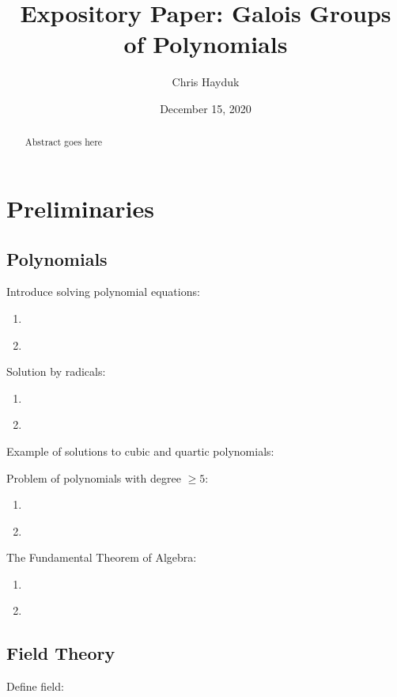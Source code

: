\documentclass[11pt, a4paper, oneside]{article}
\theoremstyle{plain}
\theoremstyle{definition}
\theoremstyle{example}
\begin{document}
\title{Expository Paper: Galois Groups of Polynomials}
\author{Chris Hayduk}
\date{December 15, 2020}
\maketitle

\begin{abstract}
Abstract goes here
\end{abstract}

\newpage
\section{Preliminaries}

\subsection{Polynomials}

Introduce solving polynomial equations:
\begin{enumerate}
\item \cite[Sec. 1.3]{stewart}
\item \cite[Ch. 1]{jorg}
\end{enumerate}

Solution by radicals:
\begin{enumerate}
\item \cite[Sec. 1.4]{stewart}
\item \cite[Ch. 1, 2]{jorg}
\end{enumerate}

Example of solutions to cubic and quartic polynomials: \cite[Ch. 1]{juliusz}

Problem of polynomials with degree $\geq 5$:
\begin{enumerate}
\item \cite[Ch. 1]{jorg}
\item \cite{galoiswiki}
\end{enumerate}

The Fundamental Theorem of Algebra: 
\begin{enumerate}
\item \cite[Section 2.2]{stewart}
\item \cite[Ch. 4]{jorg} 
\end{enumerate}

\subsection{Field Theory}

Define field: \cite[Sec. 7.1]{dummit}
\end{document}
